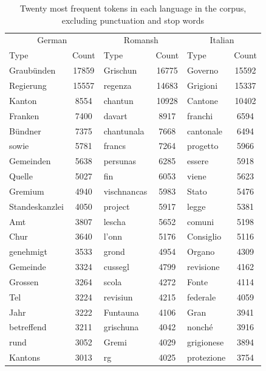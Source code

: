 \begin{table}
\centering
\begin{tabular}{lc|lc|lc}
\toprule
\multicolumn{2}{c|}{German} &  \multicolumn{2}{c|}{Romansh} & \multicolumn{2}{c}{Italian} \\
Type & Count & Type & Count & Type & Count\\
\midrule
Graubünden	&	17859	&	Grischun	&	16775	&	Governo	&	15592 \\ 
Regierung	&	15557	&	regenza	&	14683	&	Grigioni	&	15337 \\ 
Kanton	&	8554	&	chantun	&	10928	&	Cantone	&	10402 \\ 
Franken	&	7400	&	davart	&	8917	&	franchi	&	6594 \\ 
Bündner	&	7375	&	chantunala	&	7668	&	cantonale	&	6494 \\ 
sowie	&	5781	&	francs	&	7264	&	progetto	&	5966 \\ 
Gemeinden	&	5638	&	persunas	&	6285	&	essere	&	5918 \\ 
Quelle	&	5027	&	fin	&	6053	&	viene	&	5623 \\ 
Gremium	&	4940	&	vischnancas	&	5983	&	Stato	&	5476 \\ 
Standeskanzlei	&	4050	&	project	&	5917	&	legge	&	5381 \\ 
Amt	&	3807	&	lescha	&	5652	&	comuni	&	5198 \\ 
Chur	&	3640	&	l'onn	&	5176	&	Consiglio	&	5116 \\ 
genehmigt	&	3533	&	grond	&	4954	&	Organo	&	4309 \\ 
Gemeinde	&	3324	&	cussegl	&	4799	&	revisione	&	4162 \\ 
Grossen	&	3264	&	scola	&	4272	&	Fonte	&	4114 \\ 
Tel	&	3224	&	revisiun	&	4215	&	federale	&	4059 \\ 
Jahr	&	3222	&	Funtauna	&	4106	&	Gran	&	3941 \\ 
betreffend	&	3211	&	grischuna	&	4042	&	nonché	&	3916 \\ 
rund	&	3052	&	Gremi	&	4029	&	grigionese	&	3894 \\ 
Kantons	&	3013	&	rg	&	4025	&	protezione	&	3754 \\ 
\bottomrule 
\end{tabular}
\caption{Twenty most frequent tokens in each language in the corpus, excluding punctuation and stop words}
\label{tab:top-20}
\end{table}

